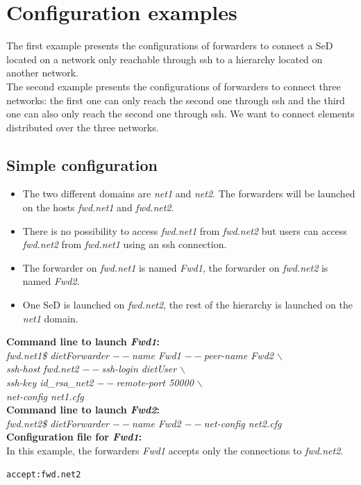 \section{Configuration examples}
\label{sec:ForwarderExamples}
The first example presents the configurations of \diet forwarders to
connect a SeD located on a network only reachable through ssh to a
\diet hierarchy located on another network.\\

The second example presents the configurations of \diet forwarders to
connect three networks: the first one can only reach the second one
through ssh and the third one can also only reach the second one
through ssh. We want to connect \diet elements distributed over the
three networks.
\subsection{Simple configuration}
\begin{itemize}
\item The two different domains are \textit{net1} and \textit{net2}. The forwarders will
  be launched on the hosts \textit{fwd.net1} and \textit{fwd.net2}.
\item There is no possibility to access \textit{fwd.net1} from
  \textit{fwd.net2} but users can access \textit{fwd.net2} from
  \textit{fwd.net1} using an ssh connection.
\item The forwarder on \textit{fwd.net1} is named \textit{Fwd1}, the
  forwarder on \textit{fwd.net2} is named \textit{Fwd2}.
\item One SeD is launched on \textit{fwd.net2}, the rest of the \diet
  hierarchy is launched on the \textit{net1} domain.\\
\end{itemize}

\noindent\textbf{Command line to launch \textit{Fwd1}: }\\
{\small \it fwd.net1\$ dietForwarder {\tiny$--$}name Fwd1
  {\tiny$--$}peer-name Fwd2 $\backslash$\\
  \hspace*{4.2cm}{\tiny$--$}ssh-host fwd.net2 {\tiny$--$}ssh-login
  dietUser $\backslash$\\
  \hspace*{4.2cm}{\tiny$--$}ssh-key id\_rsa\_net2
  {\tiny$--$}remote-port 50000 $\backslash$\\
  \hspace*{4.2cm}{\tiny$--$}net-config net1.cfg}\\[2mm]
\noindent\textbf{Command line to launch \textit{Fwd2}: }\\
{\small \it fwd.net2\$ dietForwarder {\tiny$--$}name Fwd2
  {\tiny$--$}net-config net2.cfg}\\[3mm]
\noindent\textbf{Configuration file for \textit{Fwd1}:}\\
In this example, the forwarders \textit{Fwd1} accepts only the
connections to \textit{fwd.net2}.
\begin{verbatim}
accept:fwd.net2
\end{verbatim}

